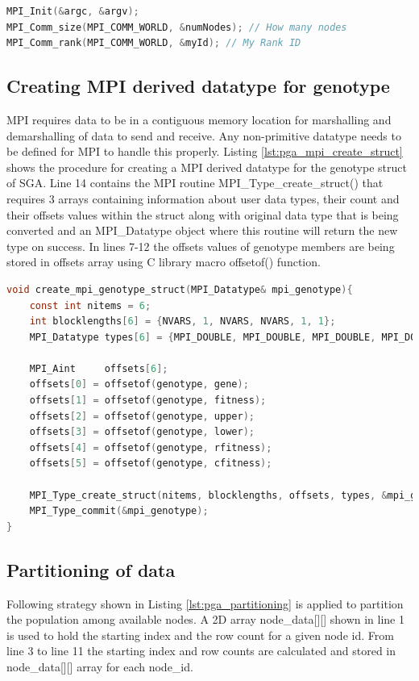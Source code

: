 \begin{lstlisting}[language=C, caption={Parallel GA implementation using MPI: Source code of main()}, label={lst:pga_initialise_mpi}]
MPI_Init(&argc, &argv);
MPI_Comm_size(MPI_COMM_WORLD, &numNodes); // How many nodes
MPI_Comm_rank(MPI_COMM_WORLD, &myId); // My Rank ID
\end{lstlisting}

\subsection{Creating MPI derived datatype for genotype}
MPI requires data to be in a contiguous memory location for marshalling and demarshalling of data to send and receive. Any non-primitive datatype needs to be defined for MPI to handle this properly. Listing \ref{lst:pga_mpi_create_struct} shows the procedure for creating a MPI derived datatype for the genotype struct of SGA. Line 14 contains the MPI routine MPI\_Type\_create\_struct() that requires 3 arrays containing information about user data types, their count and their offsets values within the struct along with original data type that is being converted and an MPI\_Datatype object where this routine will return the new type on success. In lines 7-12 the offsets values of genotype members are being stored in offsets array using C library macro offsetof() function.

\begin{lstlisting}[language=C, caption={Creating an MPI derived data type for genotype struct.}, label={lst:pga_mpi_create_struct}]
void create_mpi_genotype_struct(MPI_Datatype& mpi_genotype){
    const int nitems = 6;
    int blocklengths[6] = {NVARS, 1, NVARS, NVARS, 1, 1};
    MPI_Datatype types[6] = {MPI_DOUBLE, MPI_DOUBLE, MPI_DOUBLE, MPI_DOUBLE, MPI_DOUBLE, MPI_DOUBLE};
    
    MPI_Aint     offsets[6];
    offsets[0] = offsetof(genotype, gene);
    offsets[1] = offsetof(genotype, fitness);
    offsets[2] = offsetof(genotype, upper);
    offsets[3] = offsetof(genotype, lower);
    offsets[4] = offsetof(genotype, rfitness);
    offsets[5] = offsetof(genotype, cfitness);
    
    MPI_Type_create_struct(nitems, blocklengths, offsets, types, &mpi_genotype);
    MPI_Type_commit(&mpi_genotype);
}
\end{lstlisting}


\subsection{Partitioning of data}
Following strategy shown in Listing \ref{lst:pga_partitioning} is applied to partition the population among available nodes. A 2D array node\_data[][] shown in line 1 is used to hold the starting index and the row count for a given node id. From line 3 to line 11 the starting index and row counts are calculated and stored in node\_data[][] array for each node\_id. 

